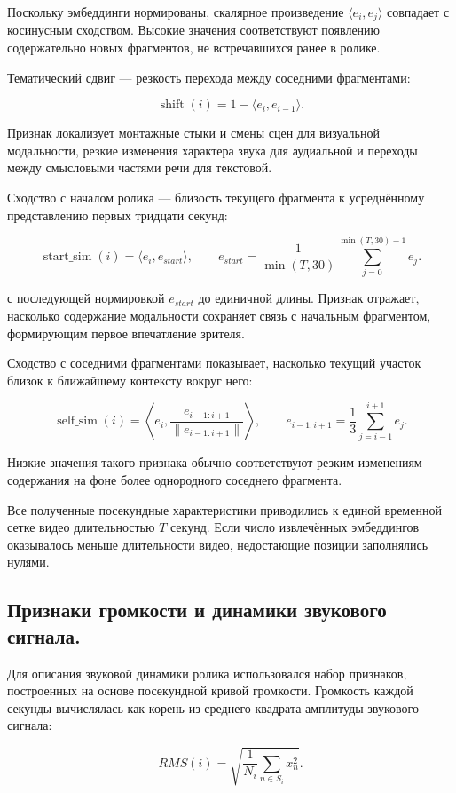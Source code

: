 \documentclass[times]{itmo-student-thesis}
\begin{document}
Поскольку эмбеддинги нормированы, скалярное произведение $\langle e_i,e_j\rangle$ совпадает с косинусным сходством. Высокие значения соответствуют появлению содержательно новых фрагментов, не встречавшихся ранее в ролике.

Тематический сдвиг — резкость перехода между соседними фрагментами:

\[
\operatorname{shift}(i)=1-\langle e_i,e_{i-1}\rangle.
\]

Признак локализует монтажные стыки и смены сцен для визуальной модальности, резкие изменения характера звука для аудиальной и переходы между смысловыми частями речи для текстовой.

Сходство с началом ролика — близость текущего фрагмента к усреднённому представлению первых тридцати секунд:

\[
\operatorname{start\_sim}(i)=\langle e_i,e_{start}\rangle, \qquad
e_{start}=\frac{1}{\min(T,30)}\sum_{j=0}^{\min(T,30)-1}e_j.
\]

с последующей нормировкой $e_{start}$ до единичной длины. Признак отражает, насколько содержание модальности сохраняет связь с начальным фрагментом, формирующим первое впечатление зрителя.

Сходство с соседними фрагментами показывает, насколько текущий участок близок к ближайшему контексту вокруг него:

\[
\operatorname{self\_sim}(i)=\left\langle e_i,\frac{e_{i-1:i+1}}{\lVert e_{i-1:i+1}\rVert}\right\rangle, \qquad
e_{i-1:i+1}=\frac{1}{3}\sum_{j=i-1}^{i+1}e_j.
\]

Низкие значения такого признака обычно соответствуют резким изменениям содержания на фоне более однородного соседнего фрагмента.

Все полученные посекундные характеристики приводились к единой временной сетке видео длительностью $T$ секунд. Если число извлечённых эмбеддингов оказывалось меньше длительности видео, недостающие позиции заполнялись нулями.

\subsection{Признаки громкости и динамики звукового сигнала.}

Для описания звуковой динамики ролика использовался набор признаков, построенных на основе посекундной кривой громкости. Громкость каждой секунды вычислялась как корень из среднего квадрата амплитуды звукового сигнала:

\[
RMS(i)=\sqrt{\frac{1}{N_i}\sum_{n\in S_i}x_n^2}.
\]
\end{document}
